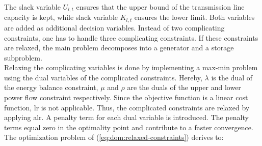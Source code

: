 The slack variable $U_{l,t}$ ensures that the upper bound of the transmission line capacity is kept, while slack variable $K_{l,t}$ ensures the lower limit. Both variables are added as additional decision variables. Instead of two complicating constraints, one has to handle three complicating constraints. If these constraints are relaxed, the main problem decomposes into a generator and a storage subproblem.\\

Relaxing the complicating variables is done by implementing a max-min problem using the dual variables of the complicated constraints. Hereby, $\lambda$ is the dual of the energy balance constraint, $\mu$ and $\rho$ are the duals of the upper and lower power flow constraint respectively. Since the objective function is a linear cost function, \gls{lr} is not applicable. Thus, the complicated constraints are relaxed by applying \gls{alr}. A penalty term for each dual variable is introduced. The penalty terms equal zero in the optimality point and contribute to a faster convergence. The optimization problem of (\ref{eq:dom:relaxed-constraints}) derives to:

